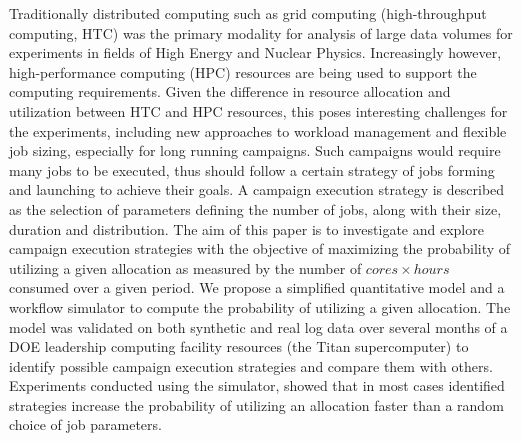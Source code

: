 Traditionally distributed computing such as grid computing (high-throughput
computing, HTC) was the primary modality for analysis of large data volumes
for experiments in fields of High Energy and Nuclear Physics.
Increasingly however, high-performance computing (HPC) resources are being
used to support the computing requirements.
Given the difference in resource allocation and utilization between HTC and
HPC resources, this poses interesting challenges for the experiments,
including new approaches to workload management and flexible job sizing,
especially for long running campaigns.
Such campaigns would require many jobs to be executed, thus should follow a
certain strategy of jobs forming and launching to achieve their goals.
A campaign execution strategy is described as the selection of parameters
defining the number of jobs, along with their size, duration and distribution.
The aim of this paper is to investigate and explore campaign execution
strategies with the objective of maximizing the probability of utilizing a
given allocation as measured by the number of $cores \times hours$ consumed
over a given period.
We propose a simplified quantitative model and a workflow simulator to compute
the probability of utilizing a given allocation.
The model was validated on both synthetic and real log data over several
months of a DOE leadership computing facility resources (the Titan
supercomputer) to identify possible campaign execution strategies and
compare them with others.
Experiments conducted using the simulator, showed that in most cases
identified strategies increase the probability of utilizing an allocation
faster than a random choice of job parameters.


